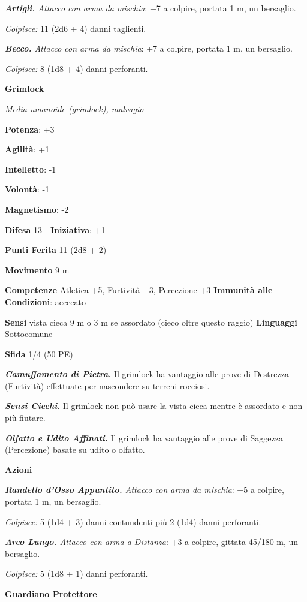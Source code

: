 \begin{multicols}{2}
\emph{\textbf{Artigli.} Attacco con arma da mischia}: +7 a colpire,
portata 1 m, un bersaglio.

\emph{Colpisce:} 11 (2d6 + 4) danni taglienti.

\emph{\textbf{Becco.} Attacco con arma da mischia}: +7 a colpire,
portata 1 m, un bersaglio.

\emph{Colpisce:} 8 (1d8 + 4) danni perforanti.

\textbf{Grimlock}

\emph{Media umanoide (grimlock), malvagio}

\textbf{Potenza}: +3

\textbf{Agilità}: +1

\textbf{Intelletto}: -1

\textbf{Volontà}: -1

\textbf{Magnetismo}: -2

\textbf{Difesa} 13 - \textbf{Iniziativa}: +1

\textbf{Punti Ferita} 11 (2d8 + 2)

\textbf{Movimento} 9 m

\textbf{Competenze} Atletica +5, Furtività +3, Percezione +3
\textbf{Immunità alle Condizioni}: accecato

\textbf{Sensi} vista cieca 9 m o 3 m se assordato (cieco oltre questo
raggio) \textbf{Linguaggi} Sottocomune

\textbf{Sfida} 1/4 (50 PE)\smallskip

\emph{\textbf{Camuffamento di Pietra.}} Il grimlock ha vantaggio alle
prove di Destrezza (Furtività) effettuate per nascondere su terreni
rocciosi.

\emph{\textbf{Sensi Ciechi.}} Il grimlock non può usare la vista cieca
mentre è assordato e non più fiutare.

\emph{\textbf{Olfatto e Udito Affinati.}} Il grimlock ha vantaggio alle
prove di Saggezza (Percezione) basate su udito o olfatto.

\smallskip\textbf{Azioni}

\emph{\textbf{Randello d'Osso Appuntito.} Attacco con arma da mischia}:
+5 a colpire, portata 1 m, un bersaglio.

\emph{Colpisce:} 5 (1d4 + 3) danni contundenti più 2 (1d4) danni
perforanti.

\emph{\textbf{Arco Lungo.} Attacco con arma a Distanza}: +3 a colpire,
gittata 45/180 m, un bersaglio.

\emph{Colpisce:} 5 (1d8 + 1) danni perforanti.

\textbf{Guardiano Protettore}


\end{multicols}
